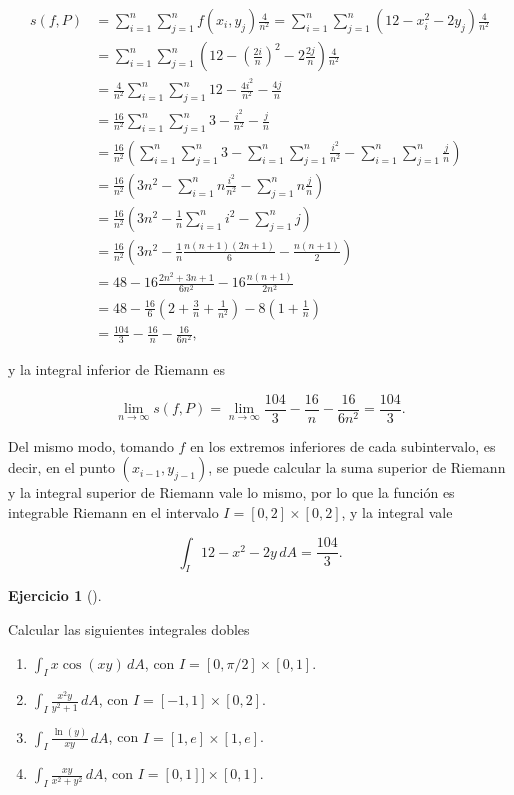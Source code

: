 \documentclass[
  spanish,
  a4paper,
]{scrreport}
\theoremstyle{definition}
\newtheorem{exercise}{Ejercicio}[chapter]
\theoremstyle{remark}
\begin{document}
\begin{tcolorbox}
\begin{align*}
s(f,P) 
&= \sum_{i=1}^n\sum_{j=1}^n f(x_i,y_j) \frac{4}{n^2}
= \sum_{i=1}^n\sum_{j=1}^n (12-x_i^2-2y_j) \frac{4}{n^2} \\
&= \sum_{i=1}^n\sum_{j=1}^n \left(12-\left(\frac{2i}{n}\right)^2-2\frac{2j}{n}\right) \frac{4}{n^2} \\
&= \frac{4}{n^2} \sum_{i=1}^n\sum_{j=1}^n 12-\frac{4i^2}{n^2}-\frac{4j}{n} \\
&= \frac{16}{n^2} \sum_{i=1}^n\sum_{j=1}^n 3-\frac{i^2}{n^2}-\frac{j}{n} \\
&= \frac{16}{n^2} \left(\sum_{i=1}^n\sum_{j=1}^n 3- \sum_{i=1}^n\sum_{j=1}^n \frac{i^2}{n^2}- \sum_{i=1}^n\sum_{j=1}^n \frac{j}{n}\right) \\
&= \frac{16}{n^2} \left(3n^2 - \sum_{i=1}^n n\frac{i^2}{n^2} - \sum_{j=1}^n n\frac{j}{n}\right) \\
&= \frac{16}{n^2} \left(3n^2 - \frac{1}{n}\sum_{i=1}^n i^2 - \sum_{j=1}^n j\right) \\
&= \frac{16}{n^2} \left(3n^2 - \frac{1}{n}\frac{n(n+1)(2n+1)}{6} - \frac{n(n+1)}{2}\right) \\
&= 48 - 16\frac{2n^2+3n+1}{6n^2} - 16\frac{n(n+1)}{2n^2} \\
&= 48 - \frac{16}{6}\left(2 +\frac{3}{n}+\frac{1}{n^2}\right) - 8\left(1+\frac{1}{n}\right) \\
&= \frac{104}{3} -\frac{16}{n} -\frac{16}{6n^2},
\end{align*}

y la integral inferior de Riemann es

\[
\lim_{n\to\infty} s(f,P)
= \lim_{n\to\infty} \frac{104}{3} -\frac{16}{n} -\frac{16}{6n^2}
= \frac{104}{3}.
\]

Del mismo modo, tomando \(f\) en los extremos inferiores de cada
subintervalo, es decir, en el punto \((x_{i-1},y_{j-1})\), se puede
calcular la suma superior de Riemann y la integral superior de Riemann
vale lo mismo, por lo que la función es integrable Riemann en el
intervalo \(I=[0,2]\times[0,2]\), y la integral vale

\[
\int_I 12-x^2-2y\,dA = \frac{104}{3}.
\]

\end{tcolorbox}

\begin{exercise}[]\protect\hypertarget{exr-integrales-dobles}{}\label{exr-integrales-dobles}

Calcular las siguientes integrales dobles

\begin{enumerate}
\def\labelenumi{\alph{enumi}.}
\item
  \(\int_I x\cos(xy)\,dA\), con \(I=[0,\pi/2]\times[0,1]\).
\item
  \(\int_I \frac{x^2y}{y^2+1}\,dA\), con \(I=[-1,1]\times[0,2]\).
\item
  \(\int_I \frac{\ln(y)}{xy}\,dA\), con \(I=[1,e]\times[1,e]\).
\item
  \(\int_I \frac{xy}{x^2+y^2}\,dA\), con \(I=[0,1]]\times[0,1]\).
\end{enumerate}

\end{exercise}
\end{document}
